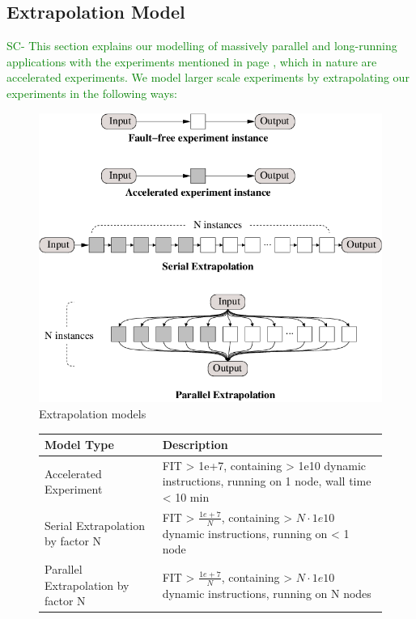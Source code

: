 \documentclass{sig-alternate}
\newcommand{\sui}[1]{%
  \textcolor{green}{SC-#1}
}
\begin{document}
\subsection{Extrapolation Model}
\label{sec:eval:extrapolation}
\sui{
This section explains our modelling of massively parallel and long-running applications with the experiments mentioned in page \pageref{sec:eval}, which in nature
are accelerated experiments. We model larger scale experiments by extrapolating our experiments in the following ways:\\
}


\begin{figure}[ht!]
\centering
\includegraphics[width=1.00\columnwidth]{figs/extrapolates.png}
\caption{Extrapolation models}
\label{fig:extrapolations}
\end{figure}

\begin{figure}[ht!]
\centering
\begin{tabular}{|p{1.0in}|p{2.0in}|}
\hline
 Model Type & Description \\
\hline
Accelerated Experiment & FIT > 1e+7, containing > 1e10 dynamic instructions, running on 1 node, wall time < 10 min \\
\hline
Serial Extrapolation by factor N & FIT > $\frac{1e+7}{N}$, containing > $N \cdot 1e10$ dynamic instructions, running on < 1 node \\
\hline
Parallel Extrapolation by factor N & FIT > $\frac{1e+7}{N}$, containing > $N \cdot 1e10$ dynamic instructions, running on N nodes \\
\hline
\end{tabular}
\end{figure}
\end{document}
